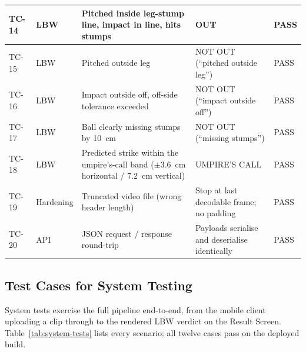 \documentclass[12pt,a4paper]{report}
\begin{document}
\begin{longtable}{|p{0.9cm}|p{2.3cm}|p{4.0cm}|p{4.0cm}|p{0.9cm}|}
TC-14 & LBW & Pitched inside leg-stump line, impact in line, hits stumps & OUT & PASS \\
\hline
TC-15 & LBW & Pitched outside leg & NOT OUT (``pitched outside leg'') & PASS \\
\hline
TC-16 & LBW & Impact outside off, off-side tolerance exceeded & NOT OUT (``impact outside off'') & PASS \\
\hline
TC-17 & LBW & Ball clearly missing stumps by 10~cm & NOT OUT (``missing stumps'') & PASS \\
\hline
TC-18 & LBW & Predicted strike within the umpire's-call band ($\pm 3.6$~cm horizontal / $7.2$~cm vertical) & UMPIRE'S CALL & PASS \\
\hline
TC-19 & Hardening & Truncated video file (wrong header length) & Stop at last decodable frame; no padding & PASS \\
\hline
TC-20 & API & JSON request / response round-trip & Payloads serialise and deserialise identically & PASS \\
\hline
\end{longtable}

\subsection{Test Cases for System Testing}

System tests exercise the full pipeline end-to-end, from the mobile client uploading a clip through to the rendered LBW verdict on the Result Screen. Table~\ref{tab:system-tests} lists every scenario; all twelve cases pass on the deployed build.
\end{document}
